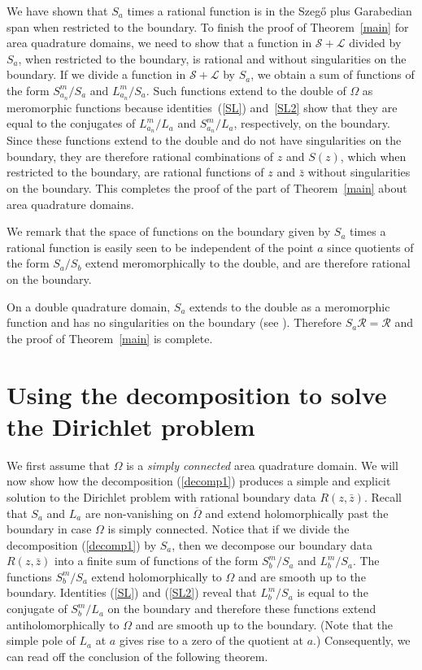 \documentclass[12pt]{amsart}
\newcommand\Om{\Omega}
\newcommand\Obar{\overline{\Omega}}
\numberwithin{equation}{section}
\begin{document}
We have shown that $S_a$ times a rational function is in
the Szeg\H o plus Garabedian span when restricted to the
boundary.  To finish the proof of Theorem~\ref{main} for area
quadrature domains, we need to show that a function
in  $\mathcal S + \mathcal L$ divided by $S_a$, when restricted
to the boundary, is rational and without singularities on
the boundary. If we divide a function in 
$\mathcal S + \mathcal L$ by $S_a$, we obtain a sum of
functions of the form $S_{a_n}^m/S_a$ and $L_{a_n}^m/S_a$.
Such functions extend to the double of $\Om$ as meromorphic
functions because identities~(\ref{SL}) and~\ref{SL2} show
that they are equal to the conjugates of
$L_{a_n}^m/L_a$ and $S_{a_n}^m/L_a$, respectively, on
the boundary. Since these functions extend to the double and
do not have singularities on the boundary, they are therefore
rational combinations of $z$ and $S(z)$,
which when restricted to the boundary, are rational functions
of $z$ and $\bar z$ without singularities on the boundary.
This completes the proof of the part of Theorem~\ref{main}
about area quadrature domains.

We remark that the space of functions on the boundary
given by $S_a$ times a rational function is easily seen
to be independent of the point $a$ since quotients of
the form $S_a/S_b$ extend meromorphically to the double,
and are therefore rational on the boundary.

On a double quadrature domain, $S_a$ extends to the
double as a meromorphic function and has no singularities
on the boundary (see \cite{BGS}). Therefore
$S_a\mathcal R = \mathcal R$ and the proof of
Theorem~\ref{main} is complete.

\section{Using the decomposition to solve the Dirichlet problem}
\label{sec3}

We first assume that $\Om$ is a {\it simply connected\/} area quadrature
domain. We will now show how the decomposition (\ref{decomp1})
produces a simple and explicit solution to the Dirichlet problem
with rational boundary data $R(z,\bar z)$. Recall that $S_a$ and
$L_a$ are non-vanishing on $\Obar$ and extend holomorphically
past the boundary in case $\Om$ is simply connected.
Notice that if we divide the decomposition
(\ref{decomp1}) by $S_a$, then we decompose our
boundary data $R(z,\bar z)$ into a finite sum of
functions of the form $S_b^m/S_a$ and $L_b^m/S_a$.
The functions $S_b^m/S_a$ extend holomorphically
to $\Om$ and are smooth up to the boundary.  Identities
(\ref{SL}) and (\ref{SL2}) reveal that $L_b^m/S_a$ is
equal to the conjugate of $S_b^m/L_a$ on the boundary and
therefore these functions extend
antiholomorphically to $\Om$ and are smooth up to
the boundary.  (Note that the simple pole of $L_a$ at $a$
gives rise to a zero of the quotient at $a$.)
Consequently, we can read off the conclusion of the
following theorem.
\end{document}
